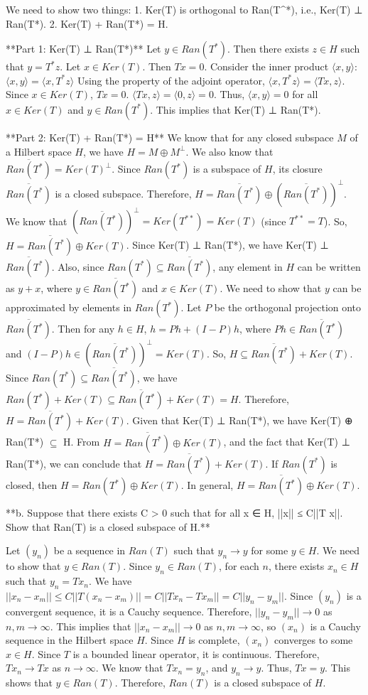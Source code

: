 We need to show two things:
1. Ker(T) is orthogonal to Ran(T^*), i.e., Ker(T) ⊥ Ran(T*).
2. Ker(T) + Ran(T*) = H.

**Part 1: Ker(T) ⊥ Ran(T*)**
Let $y \in Ran(T^*)$. Then there exists $z \in H$ such that $y = T^* z$.
Let $x \in Ker(T)$. Then $Tx = 0$.
Consider the inner product $\langle x, y \rangle$:
$\langle x, y \rangle = \langle x, T^* z \rangle$
Using the property of the adjoint operator, $\langle x, T^* z \rangle = \langle Tx, z \rangle$.
Since $x \in Ker(T)$, $Tx = 0$.
$\langle Tx, z \rangle = \langle 0, z \rangle = 0$.
Thus, $\langle x, y \rangle = 0$ for all $x \in Ker(T)$ and $y \in Ran(T^*)$.
This implies that Ker(T) ⊥ Ran(T*).

**Part 2: Ker(T) + Ran(T*) = H**
We know that for any closed subspace $M$ of a Hilbert space $H$, we have $H = M \oplus M^\perp$.
We also know that $\overline{Ran(T^*)} = Ker(T)^\perp$.
Since $Ran(T^*)$ is a subspace of $H$, its closure $\overline{Ran(T^*)}$ is a closed subspace.
Therefore, $H = \overline{Ran(T^*)} \oplus (\overline{Ran(T^*)})^\perp$.
We know that $(\overline{Ran(T^*)})^\perp = Ker(T^{**}) = Ker(T)$ (since $T^{**} = T$).
So, $H = \overline{Ran(T^*)} \oplus Ker(T)$.
Since Ker(T) ⊥ Ran(T*), we have Ker(T) ⊥ $\overline{Ran(T^*)}$.
Also, since $Ran(T^*) \subseteq \overline{Ran(T^*)}$, any element in $H$ can be written as $y + x$, where $y \in \overline{Ran(T^*)}$ and $x \in Ker(T)$.
We need to show that $y$ can be approximated by elements in $Ran(T^*)$.
Let $P$ be the orthogonal projection onto $\overline{Ran(T^*)}$. Then for any $h \in H$, $h = P h + (I - P) h$, where $P h \in \overline{Ran(T^*)}$ and $(I - P) h \in (\overline{Ran(T^*)})^\perp = Ker(T)$.
So, $H \subseteq \overline{Ran(T^*)} + Ker(T)$.
Since $Ran(T^*) \subseteq \overline{Ran(T^*)}$, we have $Ran(T^*) + Ker(T) \subseteq \overline{Ran(T^*)} + Ker(T) = H$.
Therefore, $H = \overline{Ran(T^*)} + Ker(T)$.
Given that Ker(T) ⊥ Ran(T*), we have Ker(T) ⊕ Ran(T*) $\subseteq$ H.
From $H = \overline{Ran(T^*)} \oplus Ker(T)$, and the fact that Ker(T) ⊥ Ran(T*), we can conclude that $H = \overline{Ran(T^*)} + Ker(T)$.
If $Ran(T^*)$ is closed, then $H = Ran(T^*) \oplus Ker(T)$.
In general, $H = \overline{Ran(T^*)} \oplus Ker(T)$.

**b. Suppose that there exists C > 0 such that for all x ∈ H, ||x|| ≤ C||T x||. Show that Ran(T) is a closed subspace of H.**

Let $(y_n)$ be a sequence in $Ran(T)$ such that $y_n \to y$ for some $y \in H$. We need to show that $y \in Ran(T)$.
Since $y_n \in Ran(T)$, for each $n$, there exists $x_n \in H$ such that $y_n = Tx_n$.
We have $||x_n - x_m|| \le C ||T(x_n - x_m)|| = C ||Tx_n - Tx_m|| = C ||y_n - y_m||$.
Since $(y_n)$ is a convergent sequence, it is a Cauchy sequence.
Therefore, $||y_n - y_m|| \to 0$ as $n, m \to \infty$.
This implies that $||x_n - x_m|| \to 0$ as $n, m \to \infty$, so $(x_n)$ is a Cauchy sequence in the Hilbert space $H$.
Since $H$ is complete, $(x_n)$ converges to some $x \in H$.
Since $T$ is a bounded linear operator, it is continuous.
Therefore, $Tx_n \to Tx$ as $n \to \infty$.
We know that $Tx_n = y_n$, and $y_n \to y$.
Thus, $Tx = y$.
This shows that $y \in Ran(T)$.
Therefore, $Ran(T)$ is a closed subspace of $H$.

